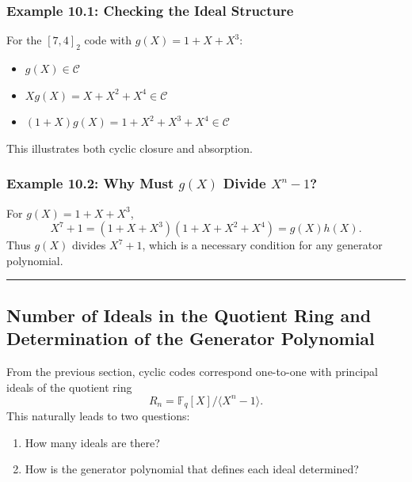 \documentclass[
]{article}
\providecommand{\tightlist}{%
  \setlength{\itemsep}{0pt}\setlength{\parskip}{0pt}}
\begin{document}
\subsubsection{Example 10.1: Checking the Ideal
Structure}\label{example-10.1-checking-the-ideal-structure}

For the \([7,4]_2\) code with \(g(X)=1+X+X^3\):

\begin{itemize}
\tightlist
\item
  \(g(X)\in\mathcal{C}\)
\item
  \(Xg(X)=X+X^2+X^4\in\mathcal{C}\)
\item
  \((1+X)g(X)=1+X^2+X^3+X^4\in\mathcal{C}\)
\end{itemize}

This illustrates both cyclic closure and absorption.

\subsubsection{\texorpdfstring{Example 10.2: Why Must \(g(X)\) Divide
\(X^n-1\)?}{Example 10.2: Why Must g(X) Divide X\^{}n-1?}}\label{example-10.2-why-must-gx-divide-xn-1}

For \(g(X)=1+X+X^3\), \[X^7+1 = (1+X+X^3)(1+X+X^2+X^4)=g(X)h(X).\] Thus
\(g(X)\) divides \(X^7+1\), which is a necessary condition for any
generator polynomial.

\begin{center}\rule{0.5\linewidth}{0.5pt}\end{center}

\subsection{Number of Ideals in the Quotient Ring and Determination of
the Generator
Polynomial}\label{number-of-ideals-in-the-quotient-ring-and-determination-of-the-generator-polynomial}

From the previous section, cyclic codes correspond one-to-one with
principal ideals of the quotient ring
\[R_n = \mathbb{F}_q[X]/\langle X^n-1 \rangle.\] This naturally leads to
two questions:

\begin{enumerate}
\def\labelenumi{\arabic{enumi}.}
\tightlist
\item
  How many ideals are there?
\item
  How is the generator polynomial that defines each ideal determined?
\end{enumerate}
\end{document}
